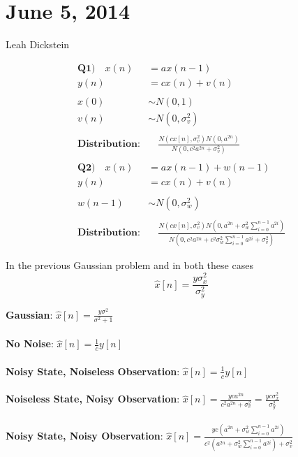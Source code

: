 \documentclass[leqno]{article}
\begin{document}
\part*{June 5, 2014}
Leah Dickstein

\begin{align*}
\textbf{Q1)} \quad x(n) &= ax(n-1)\\
y(n) &= cx(n) + v(n)\\
&\\
x(0) &\sim N(0,1)\\
v(n) &\sim N(0,\sigma_v^2)\\
&\\
\textbf{Distribution}: &\quad \frac{N(cx[n],\sigma_v^2)N(0,a^{2n})}{N(0,c^2a^{2n}+\sigma_v^2)}\\
&\\
\textbf{Q2)} \quad x(n) &= ax(n-1)+w(n-1)\\
y(n) &= cx(n)+v(n)\\
&\\
w(n-1) &\sim N(0,\sigma_w^2)\\
&\\
\textbf{Distribution}: &\quad \frac{N(cx[n],\sigma_v^2)N(0,a^{2n}+\sigma_w^2\sum_{i=0}^{n-1}a^{2i})}{N(0,c^2a^{2n}+c^2\sigma_w^2\sum_{i=0}^{n-1}a^{2i}+\sigma_v^2)}
\end{align*}

In the previous Gaussian problem and in both these cases\\
\[ \hat{x}[n] = \frac{y\sigma_x^2}{\sigma_y^2} \]

\textbf{Gaussian}: $\hat{x}[n] = \frac{y\sigma^2}{\sigma^2+1}$\\\\
\textbf{No Noise}: $\hat{x}[n] = \frac{1}{c}y[n]$\\\\
\textbf{Noisy State, Noiseless Observation}: $\hat{x}[n] = \frac{1}{c}y[n]$\\\\
\textbf{Noiseless State, Noisy Observation}: $\hat{x}[n] = \frac{yca^{2n}}{c^2a^{2n}+\sigma_v^2} = \frac{yc\sigma_x^2}{\sigma_y^2}$\\\\
\textbf{Noisy State, Noisy Observation}: $\hat{x}[n] = \frac{yc(a^{2n}+\sigma_w^2\sum_{i=0}^{n-1}a^{2i})}{c^2(a^{2n}+\sigma_w^2\sum_{i=0}^{n-1}a^{2i})+\sigma_v^2}$
\end{document}
